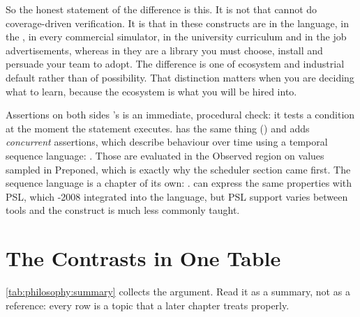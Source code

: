 So the honest statement of the difference is this. It is not that \VHDL{}
cannot do coverage-driven verification. It is that in \SV{} these constructs
are in the language, in the \LRM{}, in every commercial simulator, in the
university curriculum and in the job advertisements, whereas in \VHDL{} they
are a library you must choose, install and persuade your team to adopt. The
difference is one of ecosystem and industrial default rather than of
possibility. That distinction matters when you are deciding what to learn,
because the ecosystem is what you will be hired into.

\begin{notebox}{Assertions on both sides}
\VHDL{}'s  is an
immediate, procedural check: it tests a condition at the moment the statement
executes. \SV{} has the same thing ()
and adds \emph{concurrent} assertions, which describe behaviour over time
using a temporal sequence language: . Those are
evaluated in the Observed region on values sampled in Preponed, which is
exactly why the scheduler section came first. The sequence language is a
chapter of its own: . \VHDL{} can express the same properties
with PSL, which \VHDL{}-2008 integrated into the language, but PSL support
varies between tools and the construct is much less commonly taught.
\end{notebox}

\section{The Contrasts in One Table}
\label{sec:philosophy:summary}

\cref{tab:philosophy:summary} collects the argument. Read it as a summary, not
as a reference: every row is a topic that a later chapter treats properly.

